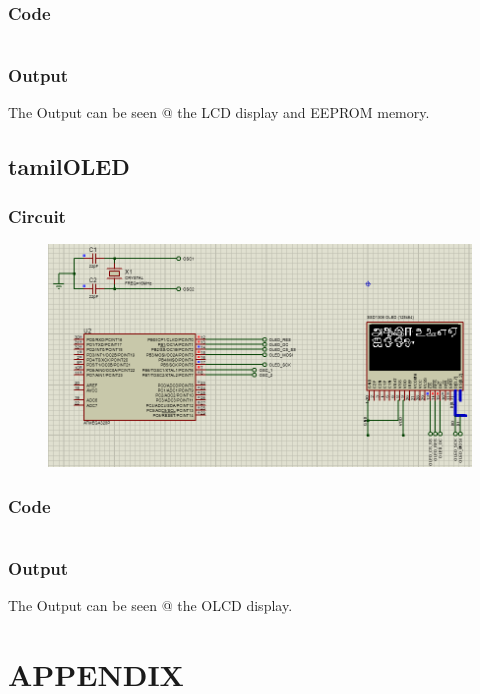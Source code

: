 \documentclass[oneside]{book}
\begin{document}
\subsection{Code}
\inputminted[bgcolor=black]{c}{../programFiles/SPIEEPROM.c}

\subsection{Output}
\quad The Output can be seen @ the LCD display and EEPROM memory.



\section{tamilOLED}
\subsection{Circuit}
\begin{figure}[H]
    \centering
    \includegraphics[height=0.2\textheight]{tamilOLED.png}
\end{figure}
\subsection{Code}
\inputminted[bgcolor=black]{c}{../programFiles/tamilOLED/tamilOLED.c}

\subsection{Output}
\quad The Output can be seen @ the OLCD display.




\chapter{APPENDIX}
\end{document}
